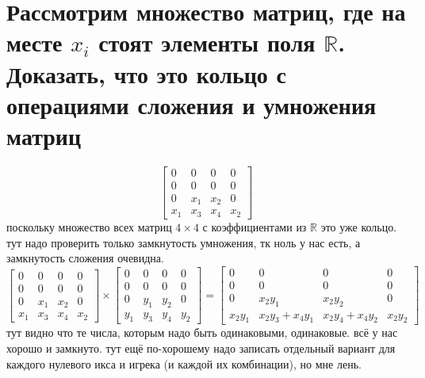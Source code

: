 \documentclass{article}
\newcommand{\ds}{\displaystyle}
\newcommand{\R}{\mathbb{R}}
\begin{document}
  \section{Рассмотрим множество матриц, где на месте $x_i$ стоят элементы поля $\R$. Доказать, что это кольцо с операциями сложения и умножения матриц}
  $$ \begin{bmatrix}0 & 0 & 0 & 0\\0 & 0 & 0 & 0\\0 & x_1 & x_2 & 0\\x_1 & x_3 & x_4 & x_2\end{bmatrix} $$
  поскольку множество всех матриц $4 \times 4$ с коэффициентами из $\R$ это уже кольцо.
  тут надо проверить только замкнутость умножения, тк ноль у нас есть, а замкнутость сложения очевидна. \\
  $\ds \left[\begin{matrix}0 & 0 & 0 & 0\\0 & 0 & 0 & 0\\0 & x_{1} & x_{2} & 0\\x_{1} & x_{3} & x_{4} & x_{2}\end{matrix}\right] \times \left[\begin{matrix}0 & 0 & 0 & 0\\0 &
  0 & 0 & 0\\0 & y_{1} & y_{2} & 0\\y_{1} & y_{3} & y_{4} & y_{2}\end{matrix}\right] = \left[\begin{matrix}0 & 0 & 0 & 0\\0 & 0 & 0 & 0\\0 & x_{2} y_{1} & x_{2} y_{2} & 0
  \\x_{2} y_{1} & x_{2} y_{3} + x_{4} y_{1} & x_{2} y_{4} + x_{4} y_{2} & x_{2} y_{2}\end{matrix}\right] $ \\
  тут видно что те числа, которым надо быть одинаковыми, одинаковые. всё у нас хорошо и замкнуто.
  тут ещё по-хорошему надо записать отдельный вариант для каждого нулевого икса и игрека (и каждой их комбинации), но мне лень.
\end{document}
